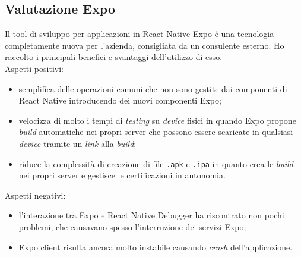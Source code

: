 \subsection{Valutazione Expo}
Il tool di sviluppo per applicazioni in React Native Expo è una tecnologia completamente nuova per l'azienda, consigliata da un consulente esterno. Ho raccolto i principali benefici e svantaggi dell'utilizzo di esso.\\
Aspetti positivi:
\begin{itemize}
	\item semplifica delle operazioni comuni che non sono gestite dai componenti di React Native introducendo dei nuovi componenti Expo;
	\item velocizza di molto i tempi di \emph{testing} su \emph{device} fisici in quando Expo propone \emph{build} automatiche nei propri server che possono essere scaricate in qualsiasi \emph{device} tramite un \emph{link} alla \emph{build};
	\item riduce la complessità di creazione di file \texttt{.apk} e \texttt{.ipa} in quanto crea le \emph{build} nei propri server e gestisce le certificazioni in autonomia.
\end{itemize}
Aspetti negativi:
\begin{itemize}
	\item l'interazione tra Expo e React Native Debugger ha riscontrato non pochi problemi, che causavano spesso l'interruzione dei servizi Expo;
	\item Expo client risulta ancora molto instabile causando \emph{crash} dell'applicazione.
\end{itemize}
\newpage
